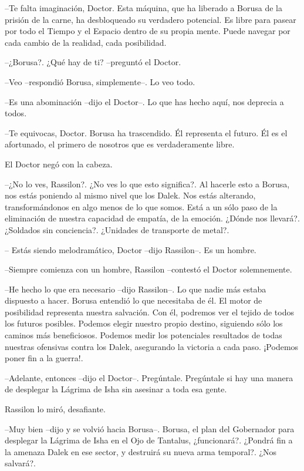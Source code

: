 --Te falta imaginación, Doctor. Esta máquina, que ha liberado a Borusa de la prisión de la carne, ha desbloqueado su verdadero potencial. Es libre para pasear por todo el Tiempo y el Espacio dentro de su propia mente. Puede navegar por cada cambio de la realidad, cada posibilidad.  

--¿Borusa?. ¿Qué hay de ti? --preguntó el Doctor. 

--Veo --respondió Borusa, simplemente--. Lo veo todo.  

--Es una abominación --dijo el Doctor--. Lo que has hecho aquí, nos deprecia a todos.  

--Te equivocas, Doctor. Borusa ha trascendido. Él representa el futuro. Él es el afortunado, el primero de nosotros que es verdaderamente libre. 



El Doctor negó con la cabeza. 



--¿No lo ves, Rassilon?. ¿No ves lo que esto significa?. Al hacerle esto a Borusa, nos estás poniendo al mismo nivel que los Dalek. Nos estás alterando, transformándonos en algo menos de lo que somos. Está a un sólo paso de la eliminación de nuestra capacidad de empatía, de la emoción. ¿Dónde nos llevará?. ¿Soldados sin conciencia?. ¿Unidades de transporte de metal?.

 -- Estás siendo melodramático, Doctor --dijo Rassilon--. Es un hombre. 

--Siempre comienza con un hombre, Rassilon --contestó el Doctor solemnemente. 

--He hecho lo que era necesario --dijo Rassilon--. Lo que nadie más estaba dispuesto a hacer. Borusa entendió lo que necesitaba de él. El motor de posibilidad representa nuestra salvación. Con él, podremos ver el tejido de todos los futuros posibles. Podemos elegir nuestro propio destino, siguiendo sólo los caminos más beneficiosos. Podemos medir los potenciales resultados de todas nuestras ofensivas contra los Dalek, asegurando la victoria a cada paso. ¡Podemos poner fin a la guerra!. 

--Adelante, entonces --dijo el Doctor--. Pregúntale. Pregúntale si hay una manera de desplegar la Lágrima de Isha sin asesinar a toda esa gente.

 

Rassilon lo miró, desafiante. 



--Muy bien --dijo y se volvió hacia Borusa--. Borusa, el plan del Gobernador para desplegar la Lágrima de Isha en el Ojo de Tantalus, ¿funcionará?. ¿Pondrá fin a la amenaza Dalek en ese sector, y destruirá su nueva arma temporal?. ¿Nos salvará?.

